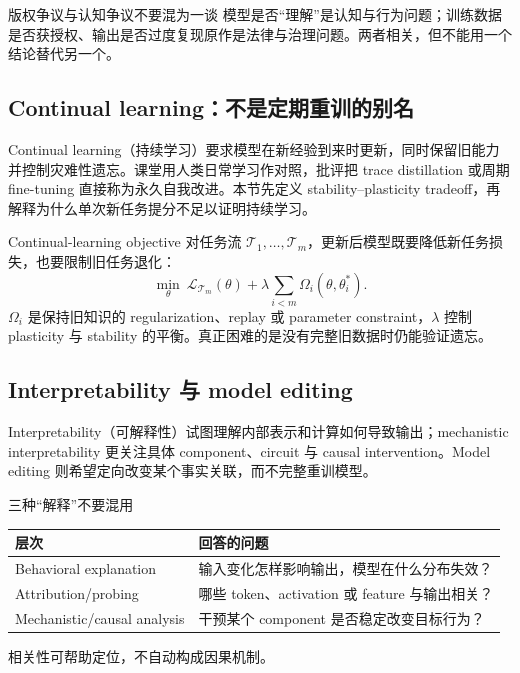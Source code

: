 \begin{warningbox}{版权争议与认知争议不要混为一谈}
模型是否“理解”是认知与行为问题；训练数据是否获授权、输出是否过度复现原作是法律与治理问题。两者相关，但不能用一个结论替代另一个。
\end{warningbox}

\subsection{Continual learning：不是定期重训的别名}

Continual learning（持续学习）要求模型在新经验到来时更新，同时保留旧能力并控制灾难性遗忘。课堂用人类日常学习作对照，批评把 trace distillation 或周期 fine-tuning 直接称为永久自我改进。本节先定义 stability--plasticity tradeoff，再解释为什么单次新任务提分不足以证明持续学习。


\begin{importantbox}{Continual-learning objective}
对任务流 $\mathcal{T}_1,\ldots,\mathcal{T}_m$，更新后模型既要降低新任务损失，也要限制旧任务退化：
\[
\min_\theta\ \mathcal{L}_{\mathcal{T}_m}(\theta)+
\lambda\sum_{i<m}\Omega_i(\theta,\theta_{i}^{*}).
\]
$\Omega_i$ 是保持旧知识的 regularization、replay 或 parameter constraint，$\lambda$ 控制 plasticity 与 stability 的平衡。真正困难的是没有完整旧数据时仍能验证遗忘。
\end{importantbox}


\subsection{Interpretability 与 model editing}

Interpretability（可解释性）试图理解内部表示和计算如何导致输出；mechanistic interpretability 更关注具体 component、circuit 与 causal intervention。Model editing 则希望定向改变某个事实关联，而不完整重训模型。


\begin{knowledgebox}{三种“解释”不要混用}
\begin{tabularx}{\textwidth}{L{0.24\textwidth} X}
\toprule
层次 & 回答的问题 \\
\midrule
Behavioral explanation & 输入变化怎样影响输出，模型在什么分布失效？ \\
Attribution/probing & 哪些 token、activation 或 feature 与输出相关？ \\
Mechanistic/causal analysis & 干预某个 component 是否稳定改变目标行为？ \\
\bottomrule
\end{tabularx}
相关性可帮助定位，不自动构成因果机制。
\end{knowledgebox}

